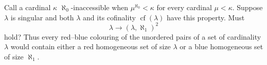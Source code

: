 Call a cardinal $\kappa$ $\aleph_0$-inaccessible when $\mu^{\aleph_0}<\kappa$ for every cardinal $\mu<\kappa$. Suppose $\lambda$ is singular and both $\lambda$ and its cofinality $\operatorname{cf}(\lambda)$ have this property. Must
\[\lambda\longrightarrow(\lambda,\aleph_1)^2\]
hold? Thus every red--blue colouring of the unordered pairs of a set of cardinality $\lambda$ would contain either a red homogeneous set of size $\lambda$ or a blue homogeneous set of size $\aleph_1$.
